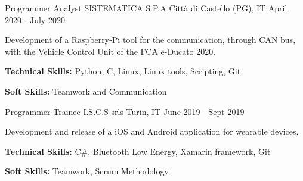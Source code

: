 

\begin{cventries}

  \cventry
    {Programmer Analyst} %
    {SISTEMATICA S.P.A} %
    {Città di Castello (PG), IT} %
    {April 2020 - July 2020} %
    {
      \begin{cvitems} %
        \item {Development of a Raspberry-Pi tool for the communication, through CAN bus, with the Vehicle Control Unit of the FCA e-Ducato 2020.}
        \item {\textbf{Technical Skills:} Python, C, Linux, Linux tools, Scripting, Git.}
        \item {\textbf{Soft Skills:} Teamwork and Communication}
      \end{cvitems}
    }

  \cventry
    {Programmer Trainee} %
    {I.S.C.S srls} %
    {Turin, IT} %
    {June 2019 - Sept 2019} %
    {
      \begin{cvitems} %
        \item {Development and release of a iOS and Android application for wearable devices.}
        \item {\textbf{Technical Skills:} C\#, Bluetooth Low Energy, Xamarin framework, Git}
        \item {\textbf{Soft Skills:} Teamwork, Scrum Methodology.}
      \end{cvitems}
    }

\end{cventries}

